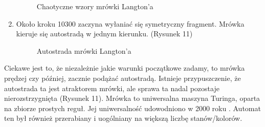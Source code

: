 \documentclass[a4paper,12pt]{article}
\begin{document}
\begin{enumerate}
\begin{figure}[!htb]
\quad
{}
\caption{Chaotyczne wzory mrówki Langton'a}
\label{fig:animals}
\end{figure}
\item Około kroku 10300 zaczyna wyłaniać się symetryczny fragment. Mrówka kieruje się autostradą w jednym kierunku. (Rysunek 11)
\begin{figure}[!htb]
\centering
{}
\quad
{}
\quad
{}
\caption{Autostrada mrówki Langton'a}
\label{fig:animals}
\end{figure}
\end{enumerate}
\newpage
Ciekawe jest to, że niezależnie jakie warunki początkowe zadamy, to mrówka prędzej czy później, zacznie podążać autostradą. Istnieje przypuszczenie, że autostrada ta jest atraktorem mrówki, ale sprawa ta nadal pozostaje nierozstrzygnięta (Rysunek 11)\cite{l}.
Mrówka to uniwersalna maszyna Turinga, oparta na zbiorze prostych reguł. Jej uniwersalność udowodniono w 2000 roku \cite{200}. Automat ten był również przerabiany i uogólniany na większą liczbę stanów/kolorów.
\newpage
\end{document}
